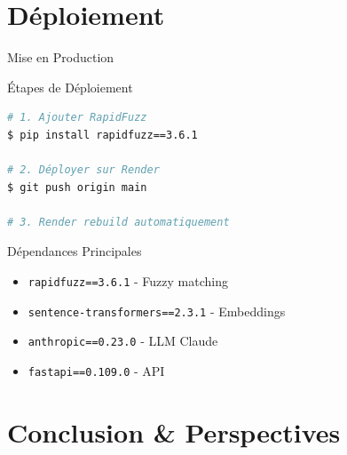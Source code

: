 \documentclass[aspectratio=169]{beamer}
\begin{document}
\section{Déploiement}

\begin{frame}[fragile]{Mise en Production}
    \begin{block}{Étapes de Déploiement}
        \small
\begin{lstlisting}[language=bash]
# 1. Ajouter RapidFuzz
$ pip install rapidfuzz==3.6.1

# 2. Déployer sur Render
$ git push origin main

# 3. Render rebuild automatiquement
\end{lstlisting}
    \end{block}

    \vspace{0.3cm}

    \begin{block}{Dépendances Principales}
        \begin{itemize}
            \item \texttt{rapidfuzz==3.6.1} - Fuzzy matching
            \item \texttt{sentence-transformers==2.3.1} - Embeddings
            \item \texttt{anthropic==0.23.0} - LLM Claude
            \item \texttt{fastapi==0.109.0} - API
        \end{itemize}
    \end{block}
\end{frame}

\section{Conclusion \& Perspectives}
\end{document}

